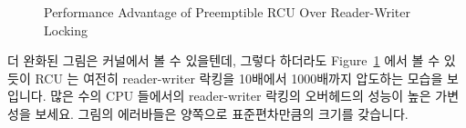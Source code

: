 \begin{figure}[tb]
\begin{center}
\end{center}
\caption{Performance Advantage of Preemptible RCU Over Reader-Writer Locking}
\label{fig:defer:Performance Advantage of Preemptible RCU Over Reader-Writer Locking}
\end{figure}

더 완화된 그림은  커널에서 볼 수 있을텐데, 그렇다 하더라도
Figure~\ref{fig:defer:Performance Advantage of Preemptible RCU Over Reader-Writer Locking}
에서 볼 수 있듯이 RCU 는 여전히 reader-writer 락킹을 10배에서 1000배까지
압도하는 모습을 보입니다.
많은 수의 CPU 들에서의 reader-writer 락킹의 오버헤드의 성능이 높은 가변성을
보세요.
그림의 에러바들은 양쪽으로 표준편차만큼의 크기를 갖습니다.


